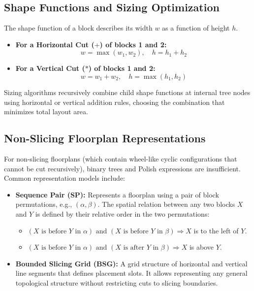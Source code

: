 \documentclass[12pt,a4paper]{article}
\begin{document}
\subsection{Shape Functions and Sizing Optimization}
The shape function of a block describes its width $w$ as a function of height $h$.
\begin{itemize}[leftmargin=*, itemsep=2pt]
  \item \textbf{For a Horizontal Cut ($+$) of blocks 1 and 2:}
        \begin{equation}
          w = \max(w_1, w_2), \quad h = h_1 + h_2
        \end{equation}
  \item \textbf{For a Vertical Cut ($*$) of blocks 1 and 2:}
        \begin{equation}
          w = w_1 + w_2, \quad h = \max(h_1, h_2)
        \end{equation}
\end{itemize}
Sizing algorithms recursively combine child shape functions at internal tree nodes using horizontal or vertical addition rules, choosing the combination that minimizes total layout area.

\subsection{Non-Slicing Floorplan Representations}
For non-slicing floorplans (which contain wheel-like cyclic configurations that cannot be cut recursively), binary trees and Polish expressions are insufficient. Common representation models include:
\begin{itemize}[leftmargin=*, itemsep=3pt]
  \item \textbf{Sequence Pair (SP):} Represents a floorplan using a pair of block permutations, e.g., $(\alpha, \beta)$. The spatial relation between any two blocks $X$ and $Y$ is defined by their relative order in the two permutations:
        \begin{itemize}[leftmargin=*, label=$\bullet$, itemsep=1pt]
          \item $(X \text{ is before } Y \text{ in } \alpha) \text{ and } (X \text{ is before } Y \text{ in } \beta) \Rightarrow X$ is to the left of $Y$.
          \item $(X \text{ is before } Y \text{ in } \alpha) \text{ and } (X \text{ is after } Y \text{ in } \beta) \Rightarrow X$ is above $Y$.
        \end{itemize}
  \item \textbf{Bounded Slicing Grid (BSG):} A grid structure of horizontal and vertical line segments that defines placement slots. It allows representing any general topological structure without restricting cuts to slicing boundaries.
\end{itemize}
\end{document}
